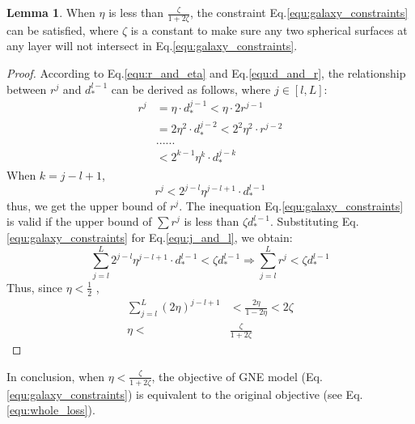 \documentclass{article}
\theoremstyle{definition}
\newtheorem{lem}{Lemma}
\begin{document}
	 \begin{lem}
	 \label{prf:eta}
	 	When $\eta$ is less than $\frac{\zeta}{1+2\zeta}$, the constraint Eq.\ref{equ:galaxy_constraints} can be satisfied, where $\zeta$ is a constant to make sure any two spherical surfaces at any layer will not intersect in Eq.\ref{equ:galaxy_constraints}. 
	 \end{lem}
	 \begin{proof} 
	 	According to Eq.\ref{equ:r_and_eta} and Eq.\ref{equ:d_and_r}, the relationship between $r^j$ and $d_*^{l-1}$ can be derived as follows, where $j \in [l, L]$:	
	 	\begin{align}
	 	\label{equ:derivation}
	 		\nonumber
	 		r^j &= \eta \cdot d_*^{j-1} < \eta \cdot 2r^{j-1} \\
	 		\nonumber
	 		&= 2\eta^2 \cdot d_*^{j-2} < 2^2\eta^2 \cdot r^{j-2} \\
	 		\nonumber
	 		&... ...\\
	 		&< 2^{k-1}\eta^k \cdot d_*^{j-k}
	 	\end{align}
	 	When $k=j-l+1$, 
	 	\begin{equation}
	 		\label{equ:j_and_l}
	 		r^j < 2^{j-l}\eta^{j-l+1} \cdot d_*^{l-1}
	 	\end{equation}
	 	thus, we get the upper bound of $r^j$. The inequation Eq.\ref{equ:galaxy_constraints} is valid if the upper bound of $\sum r^j$ is less than $\zeta d_*^{l-1}$. Substituting Eq.\ref{equ:galaxy_constraints} for Eq.\ref{equ:j_and_l}, we obtain:
	 	\begin{equation}
	 	\nonumber
	 	\sum_{j=l}^L 2^{j-l} \eta^{j-l+1} \cdot d_*^{l-1} < \zeta d_*^{l-1} \Rightarrow \sum_{j=l}^L r^j < \zeta d_*^{l-1} 
	 	\end{equation}
	 	Thus, since $\eta < \frac{1}{2}$ , 
	 	\begin{align}
	 	\nonumber
	 	\sum_{j=l}^L (2\eta)^{j-l+1}& < \frac{2\eta}{1-2\eta}< 2 \zeta \\
	 	\nonumber
	 	\eta <& \frac{\zeta}{1+2\zeta}
	 	\end{align}
	 \end{proof}
	 In conclusion, when $\eta < \frac{\zeta}{1+2\zeta}$, the objective of GNE model (Eq.\ref{equ:galaxy_constraints}) is equivalent to the original objective (see Eq.\ref{equ:whole_loss}).
	 
\end{document}
